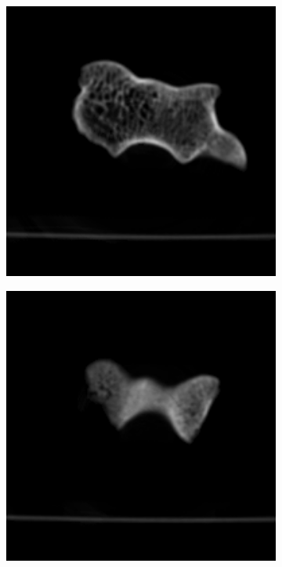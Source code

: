 \documentclass[journal]{IEEEtran}
\begin{document}
\begin{figure}[!h]
{\begin{subfigure}[b]{0.155\linewidth}
        \caption{}
     \end{subfigure}
\begin{subfigure}[b]{0.155\linewidth}
        \includegraphics[width=1\textwidth]{../images/humerus/humerus_template5.png}
        \caption{}
     \end{subfigure}
\begin{subfigure}[b]{0.155\linewidth}
        \includegraphics[width=1\textwidth]{../images/humerus/humerus_template6.png}

\end{subfigure}}
\end{figure}
\end{document}
